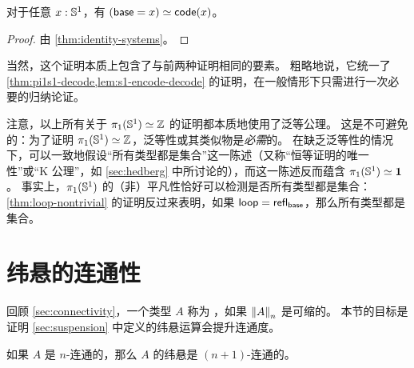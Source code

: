 \begin{cor}
  对于任意 $x:\Sn^1$，有 $\eqv{(\base=x)}{\code(x)}$。
\end{cor}

\begin{proof}
  由 \cref{thm:identity-systems}。
\end{proof}

当然，这个证明本质上包含了与前两种证明相同的要素。
粗略地说，它统一了 \cref{thm:pi1s1-decode,lem:s1-encode-decode} 的证明，在一般情形下只需进行一次必要的归纳论证。

\begin{rmk}
  注意，以上所有关于 $\eqv{\pi_1(\Sn^1)}{\Z}$ 的证明都本质地使用了泛等公理。
  这是不可避免的：为了证明 $\eqv{\pi_1(\Sn^1)}{\Z}$，泛等性或其类似物是\emph{必需}的。
  在缺乏泛等性的情况下，可以一致地假设``所有类型都是集合''这一陈述（又称``恒等证明的唯一性''或``K 公理''，如 \cref{sec:hedberg} 中所讨论的），而这一陈述反而蕴含 $\eqv{\pi_1(\Sn^1)}{\unit}$。
  事实上，$\pi_1(\Sn^1)$ 的（非）平凡性恰好可以检测是否所有类型都是集合：\cref{thm:loop-nontrivial} 的证明反过来表明，如果 $\lloop=\refl{\base}$，那么所有类型都是集合。
\end{rmk}

\section{纬悬的连通性}
\label{sec:conn-susp}

回顾 \cref{sec:connectivity}，一个类型 $A$ 称为 ，如果 $\trunc nA$ 是可缩的。
本节的目标是证明 \cref{sec:suspension} 中定义的纬悬运算会提升连通度。

\begin{thm} \label{thm:suspension-increases-connectedness}
  如果 $A$ 是 $n$-连通的，那么 $A$ 的纬悬是 $(n+1)$-连通的。
\end{thm}

